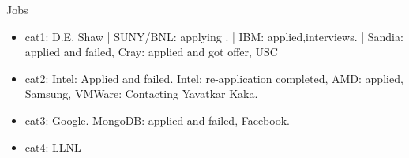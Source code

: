 \documentclass[serif, mathserif, final]{beamer}
\begin{document}
\begin{frame}[label=socialInt] %
  \begin{block}{Jobs}
    \begin{itemize}
      \tiny \item \tiny cat1: D.E. Shaw | SUNY/BNL: applying . | IBM: applied,interviews.  | Sandia:
      applied and failed, Cray: applied and got offer, USC
    \item \tiny cat2: Intel: Applied and failed. Intel: re-application
      completed, AMD: applied, Samsung, VMWare: Contacting Yavatkar Kaka. 
    \item \tiny cat3: Google. MongoDB: applied and failed, Facebook. 
    \item \tiny cat4: LLNL 
    \end{itemize} 
  \end{block}




\end{frame}
\end{document}
